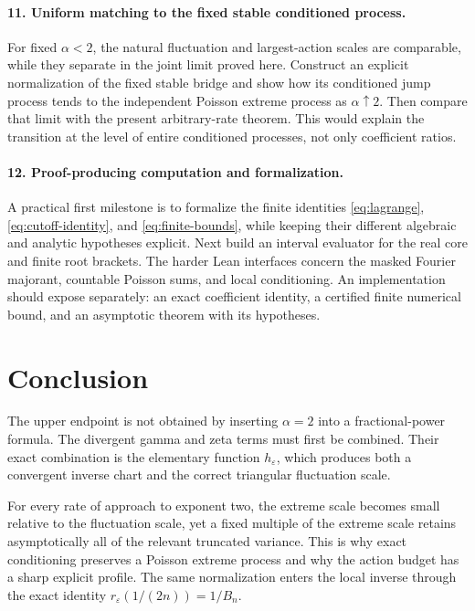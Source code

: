 \documentclass[11pt,a4paper]{article}
\numberwithin{equation}{section}
\theoremstyle{definition}
\theoremstyle{remark}
\newcommand{\eps}{\varepsilon}
\begin{document}
\paragraph{11. Uniform matching to the fixed stable conditioned process.}
For fixed \(\alpha<2\), the natural fluctuation and largest-action scales
are comparable, while they separate in the joint limit proved here.
Construct an explicit normalization of the fixed stable bridge and show how
its conditioned jump process tends to the independent Poisson extreme
process as \(\alpha\uparrow2\). Then compare that limit with the present
arbitrary-rate theorem. This would explain the transition at the level of
entire conditioned processes, not only coefficient ratios.

\paragraph{12. Proof-producing computation and formalization.}
A practical first milestone is to formalize the finite identities
\eqref{eq:lagrange}, \eqref{eq:cutoff-identity}, and
\eqref{eq:finite-bounds}, while keeping their different algebraic and analytic
hypotheses explicit. Next build an interval evaluator for the real core and
finite root brackets. The harder Lean interfaces concern the masked Fourier
majorant, countable Poisson sums, and local conditioning. An implementation
should expose separately: an exact coefficient identity, a certified finite
numerical bound, and an asymptotic theorem with its hypotheses.

\section{Conclusion}
The upper endpoint is not obtained by inserting \(\alpha=2\) into a
fractional-power formula. The divergent gamma and zeta terms must first be
combined. Their exact combination is the elementary function
\(h_\eps\), which produces both a convergent inverse chart and the correct
triangular fluctuation scale.

For every rate of approach to exponent two, the extreme scale becomes small
relative to the fluctuation scale, yet a fixed multiple of the extreme scale
retains asymptotically all of the relevant truncated variance. This is why
exact conditioning preserves a Poisson extreme process and why the action
budget has a sharp explicit profile. The same normalization enters the local
inverse through the exact identity \(r_\eps(1/(2n))=1/B_n\).
\end{document}
